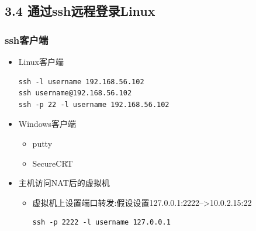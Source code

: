 \documentclass[xcolor=svgnames,presentation]{beamer}
\begin{document}
\subsection{3.4 通过ssh远程登录Linux}
\label{sec-3-4}
\begin{frame}[fragile]
\frametitle{ssh客户端}
\label{sec-3-4-1}
\begin{itemize}

\item Linux客户端\\
\label{sec-3-4-1-1}%
\begin{verbatim}
ssh -l username 192.168.56.102
ssh username@192.168.56.102
ssh -p 22 -l username 192.168.56.102
\end{verbatim}

\item Windows客户端
\label{sec-3-4-1-2}%
\begin{itemize}

\item putty
\label{sec-3-4-1-2-1}%

\item SecureCRT
\label{sec-3-4-1-2-2}%
\end{itemize} %

\item 主机访问NAT后的虚拟机
\label{sec-3-4-1-3}%
\begin{itemize}

\item 虚拟机上设置端口转发:假设设置127.0.0.1:2222-->10.0.2.15:22\\
\label{sec-3-4-1-3-1}%
\begin{verbatim}
ssh -p 2222 -l username 127.0.0.1
\end{verbatim}
\end{itemize} %
\end{itemize} %
\end{frame}
\end{document}

